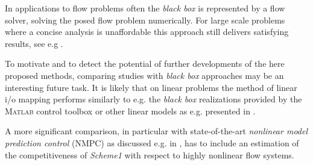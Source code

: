 \documentclass[a4paper,10pt,BCOR=15mm]{scrbook}
\begin{document}
In applications to flow problems often the \textit{black box} is represented by a flow solver, solving the posed flow problem numerically. For large scale problems where a concise analysis is unaffordable this approach still delivers satisfying results, see e.g \cite{moi}.

 To motivate and to detect the potential of further developments of the here proposed methods, comparing studies with \textit{black box} approaches may be an interesting future task. It is likely that on linear problems the method of linear i/o mapping performs similarly to e.g. the \textit{black box} realizations provided by the \textsc{Matlab} control toolbox \cite{matconbo} or other linear models as e.g. presented in \cite{ljun}. 

A more significant comparison, in particular with state-of-the-art \textit{nonlinear model prediction control} (NMPC) as discussed e.g. in \cite{allgoewer2006,bock2006,bock2000a,hiku2}, has to include an estimation of the competitiveness of \textit{Scheme1} with respect to highly nonlinear flow systems.


\end{document}
